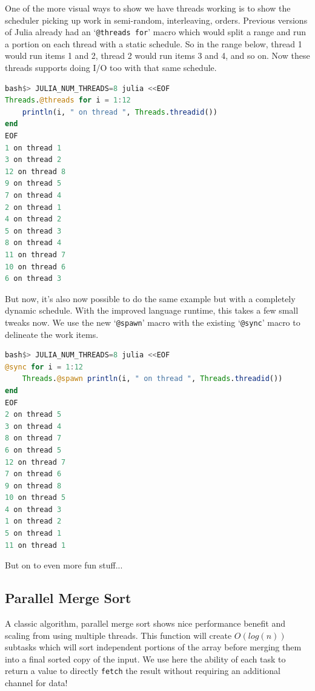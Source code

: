 \documentclass{juliacon}
\begin{document}
One of the more visual ways to show we have threads working is to show the scheduler picking up work in semi-random, interleaving, orders. Previous versions of Julia already had an `\verb|@threads for|' macro which would split a range and run a portion on each thread with a static schedule. So in the range below, thread 1 would run items 1 and 2, thread 2 would run items 3 and 4, and so on. Now these threads supports doing I/O too with that same schedule.

\begin{lstlisting}[language = Julia]
bash$> JULIA_NUM_THREADS=8 julia <<EOF
Threads.@threads for i = 1:12
    println(i, " on thread ", Threads.threadid())
end
EOF
1 on thread 1
3 on thread 2
12 on thread 8
9 on thread 5
7 on thread 4
2 on thread 1
4 on thread 2
5 on thread 3
8 on thread 4
11 on thread 7
10 on thread 6
6 on thread 3
\end{lstlisting}

But now, it's also now possible to do the same example but with a completely dynamic schedule. With the improved language runtime, this takes a few small tweaks now. We use the new `\verb|@spawn|' macro with the existing `\verb|@sync|' macro to delineate the work items.

\begin{lstlisting}[language = Julia]
bash$> JULIA_NUM_THREADS=8 julia <<EOF
@sync for i = 1:12
    Threads.@spawn println(i, " on thread ", Threads.threadid())
end
EOF
2 on thread 5
3 on thread 4
8 on thread 7
6 on thread 5
12 on thread 7
7 on thread 6
9 on thread 8
10 on thread 5
4 on thread 3
1 on thread 2
5 on thread 1
11 on thread 1
\end{lstlisting}

But on to even more fun stuff...

\subsection{Parallel Merge Sort}
\label{subsub:psort}

A classic algorithm, parallel merge sort shows nice performance benefit and scaling from using multiple threads. This function will create $O(log(n))$ subtasks which will sort independent portions of the array before merging them into a final sorted copy of the input. We use here the ability of each task to return a value to directly \verb|fetch| the result without requiring an additional channel for data!
\end{document}
